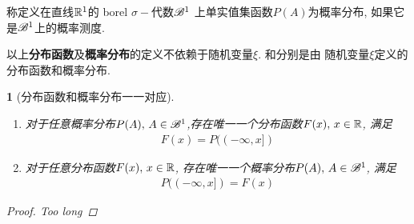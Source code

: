 \begin{probability_distribution}[概率分布]
称定义在直线\(\Rs^1\)的 borel \(\sigma-\)代数\(\msB^1\) 上单实值集函数\(P(A)\)为概率分布,
如果它是\(\msB^1\)上的概率测度.
\end{probability_distribution}

以上{\bf 分布函数}及{\bf 概率分布}的定义不依赖于随机变量\(\xi\).
和分别是由
随机变量\(\xi\)定义的分布函数和概率分布.

\newtheorem{relation_between_two_concept_above}[theorem_root]{\theorem}
\begin{relation_between_two_concept_above}[分布函数和概率分布一一对应]
\ \par
\begin{enumerate}
\item 对于任意概率分布\(P(A),\,A\in\msB^1\),存在唯一一个分布函数\(F(x),\,x\in\Rs\), 满足
\begin{align}
    F(x) = P((-\infty, x])
\end{align}
\item 对于任意分布函数\(F(x),\,x\in\Rs\), 存在唯一一个概率分布\(P(A),\,A\in\msB^1\), 满足
\begin{align}
    P((-\infty, x]) = F(x)
\end{align}
\end{enumerate}
\begin{proof}Too long\end{proof}
\end{relation_between_two_concept_above}

